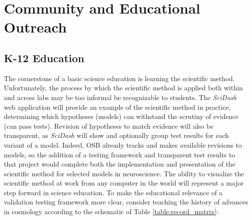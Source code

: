 \documentclass[11pt,letterpaper]{article}
\begin{document}
\section{Community and Educational Outreach}
\subsection{K-12 Education}
The cornerstone of a basic science education is learning the scientific method.  Unfortunately, the process by which the scientific method is applied both within and across labs may be too informal be recognizable to students.  The \textit{SciDash} web application will provide an example of the scientific method in practice, determining which hypotheses (models) can withstand the scrutiny of evidence (can pass tests).  Revision of hypotheses to match evidence will also be transparent, as \textit{SciDash} will show and optionally group test results for each variant of a model.  Indeed, OSB already tracks and makes available revisions to models, so the addition of a testing framework and transparent test results to that project would complete both the implementation and presentation of the scientific method for selected models in neuroscience.  The ability to visualize the scientific method at work from any computer in the world will represent a major step forward in science education.  
To make the educational relevance of a validation testing framework more clear, consider teaching the history of advances in cosmology according 
to the schematic of Table \ref{table:record_matrix}:  
\end{document}
